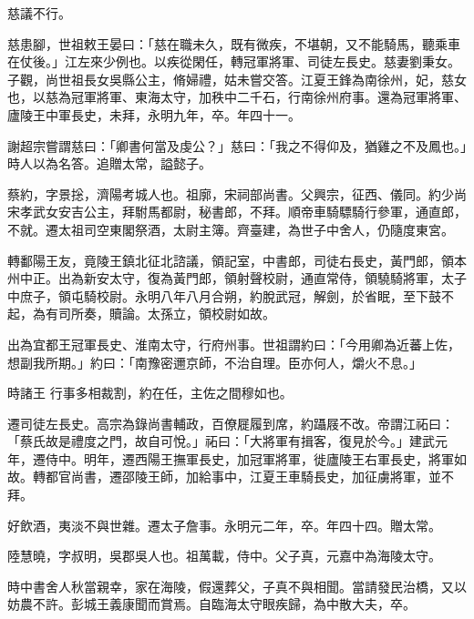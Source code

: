 \begin{pinyinscope}
 慈議不行。



 慈患腳，世祖敕王晏曰：「慈在職未久，既有微疾，不堪朝，又不能騎馬，聽乘車在仗後。」江左來少例也。以疾從閑任，轉冠軍將軍、司徒左長史。慈妻劉秉女。子觀，尚世祖長女吳縣公主，脩婦禮，姑未嘗交答。江夏王鋒為南徐州，妃，慈女也，以慈為冠軍將軍、東海太守，加秩中二千石，行南徐州府事。還為冠軍將軍、廬陵王中軍長史，未拜，永明九年，卒。年四十一。



 謝超宗嘗謂慈曰：「卿書何當及虔公？」慈曰：「我之不得仰及，猶雞之不及鳳也。」時人以為名答。追贈太常，謚懿子。



 蔡約，字景捴，濟陽考城人也。祖廓，宋祠部尚書。父興宗，征西、儀同。約少尚宋孝武女安吉公主，拜駙馬都尉，秘書郎，不拜。順帝車騎驃騎行參軍，通直郎，不就。遷太祖司空東閣祭酒，太尉主簿。齊臺建，為世子中舍人，仍隨度東宮。



 轉鄱陽王友，竟陵王鎮北征北諮議，領記室，中書郎，司徒右長史，黃門郎，領本州中正。出為新安太守，復為黃門郎，領射聲校尉，通直常侍，領驍騎將軍，太子中庶子，領屯騎校尉。永明八年八月合朔，約脫武冠，解劍，於省眠，至下鼓不起，為有司所奏，贖論。太孫立，領校尉如故。



 出為宜都王冠軍長史、淮南太守，行府州事。世祖謂約曰：「今用卿為近蕃上佐，想副我所期。」約曰：「南豫密邇京師，不治自理。臣亦何人，爝火不息。」



 時諸王
 行事多相裁割，約在任，主佐之間穆如也。



 遷司徒左長史。高宗為錄尚書輔政，百僚屣履到席，約躡屐不改。帝謂江祏曰：「蔡氏故是禮度之門，故自可悅。」祏曰：「大將軍有揖客，復見於今。」建武元年，遷侍中。明年，遷西陽王撫軍長史，加冠軍將軍，徙廬陵王右軍長史，將軍如故。轉都官尚書，遷邵陵王師，加給事中，江夏王車騎長史，加征虜將軍，並不拜。



 好飲酒，夷淡不與世雜。遷太子詹事。永明元二年，卒。年四十四。贈太常。



 陸慧曉，字叔明，吳郡吳人也。祖萬載，侍中。父子真，元嘉中為海陵太守。



 時中書舍人秋當親幸，家在海陵，假還葬父，子真不與相聞。當請發民治橋，又以妨農不許。彭城王義康聞而賞焉。自臨海太守眼疾歸，為中散大夫，卒。




\end{pinyinscope}
